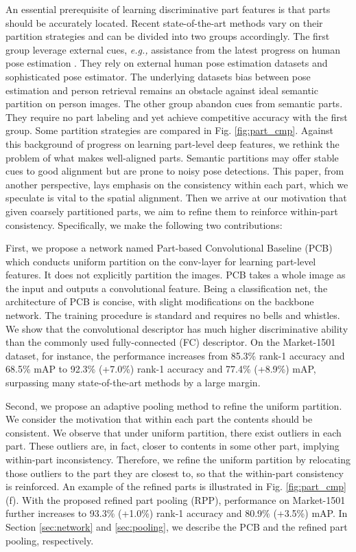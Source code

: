 \documentclass[10pt,twocolumn,letterpaper]{article}
\begin{document}
An essential prerequisite of learning discriminative part features is that parts should be accurately located. Recent state-of-the-art methods vary on their partition strategies and can be divided into two groups accordingly. The first group \cite {DBLP:journals/corr/ZhengHLY17,Su2017Pose,Wei2017GLAD} leverage external cues, \emph{e.g.,} assistance from the latest progress  on human pose estimation \cite{pose:Long2015Fully,pose:CPM,pose:DeeperCut,pose:hourglass,pose:Cao2016Realtime}. They rely on external human pose estimation datasets and sophisticated pose estimator. The underlying datasets bias between pose estimation and person retrieval remains an obstacle against ideal semantic partition on person images. The other group \cite{Yao2017Deep,Zhao2017Deeply,Liu2017HydraPlus} abandon cues from semantic parts. They require no part labeling and yet achieve competitive accuracy with the first group. Some partition strategies are compared in Fig. \ref{fig:part_cmp}.
Against this background of progress on learning part-level deep features, we rethink the problem of what makes well-aligned parts. Semantic partitions may offer stable cues to good alignment but are prone to noisy pose detections. This paper, from another perspective, lays emphasis on the consistency within each part, which we speculate is vital to the spatial alignment. Then we arrive at our motivation that given coarsely partitioned parts, we aim to refine them to reinforce within-part consistency. Specifically, we make the following two contributions:

First, we propose a network named Part-based Convolutional Baseline (PCB) which conducts uniform partition on the conv-layer for learning part-level features. It does not explicitly partition the images. PCB takes a whole image as the input and outputs a convolutional feature. Being a classification net, the architecture of PCB is concise, with slight modifications on the backbone network. The training procedure is standard and requires no bells and whistles. We show that the convolutional descriptor has much higher discriminative ability than the commonly used fully-connected (FC) descriptor. On the Market-1501 dataset, for instance, the performance increases from 85.3\% rank-1 accuracy and 68.5\% mAP to 92.3\% (+7.0\%) rank-1 accuracy and 77.4\% (+8.9\%) mAP, surpassing many state-of-the-art methods by a large margin.

Second, we propose an adaptive pooling method to refine the uniform partition. We consider the motivation that within each part the contents should be consistent. We observe that under uniform partition, there exist outliers in each part. These outliers are, in fact, closer to contents in some other part, implying within-part inconsistency. Therefore, we refine the uniform partition by relocating those outliers to the part they are closest to, so that the within-part consistency is reinforced. An example of the refined parts is illustrated in Fig. \ref{fig:part_cmp}(f). With the proposed refined part pooling (RPP), performance on Market-1501 further increases to 93.3\% (+1.0\%) rank-1 accuracy and 80.9\% (+3.5\%) mAP.
In Section \ref{sec:network} and \ref{sec:pooling}, we describe the PCB and the refined part pooling, respectively.
\end{document}
